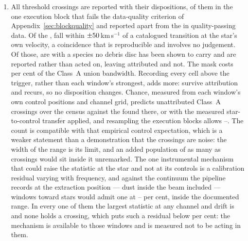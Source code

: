 \begin{enumerate}[leftmargin=1.6em,itemsep=4pt,topsep=4pt,parsep=0pt]
\item All \EvNCrossRaw{} threshold crossings are reported with their
dispositions, \PrFlagXrossWord{} of them in the one execution block that
fails the data-quality criterion of Appendix~\ref{sec:blockquality} and
reported apart from the \EvNCrossQp{} in quality-passing data. Of the
\EvNCrossRaw, \MkNCoinc{} fall within $\pm50$\,km\,s$^{-1}$ of a
catalogued transition at the star's own velocity, a coincidence that is
reproducible and involves no judgement. Of those, \MkNSODecideWord{} are with
a species no debris disc has been shown to carry and are reported rather than
acted on, leaving \MkAttr{} attributed and \MkUnattr{} not. The mask costs
\MkMaskAPct{} per cent of the Class~A union bandwidth. Recording every cell
above the trigger, rather than each window's strongest, adds \CkNSecondary{}
more: \CkNSecUnattrWord{} survive attribution and \CkNRecurWord{} recurs, so
no disposition changes. Chance,
measured from each window's own control positions and channel grid, predicts
\CeExp{} unattributed Class~A crossings over the census against the \CeObs{}
found there, or \CeExpX{} with the measured star-to-control transfer applied,
and resampling the execution blocks allows \CeLo--\CeHi. The count is
compatible with that empirical control expectation, which is a weaker
statement than a demonstration that the crossings are noise: the width of the
range is its limit, and an added population of as many as \CeAddBlind{}
crossings would sit inside it unremarked. The one instrumental mechanism that
could raise the statistic at the star and not at its controls is a
calibration residual varying with frequency, and against the continuum the
pipeline records at the extraction position --- dust inside the beam included
--- \CxNAdmitWord{} windows toward \CxNAdmitStarWord{} stars would admit one at
\CxEpsAdmitLoPct--\CxEpsAdmitHiPct{} per cent, inside the documented range.
In every one of them the largest statistic at any channel and drift is
\CxAdmitTstarHi{} and none holds a crossing, which puts such a residual below
\CxResidHiPct{} per cent: the mechanism is available to those windows and is
measured not to be acting in them.


\end{enumerate}
